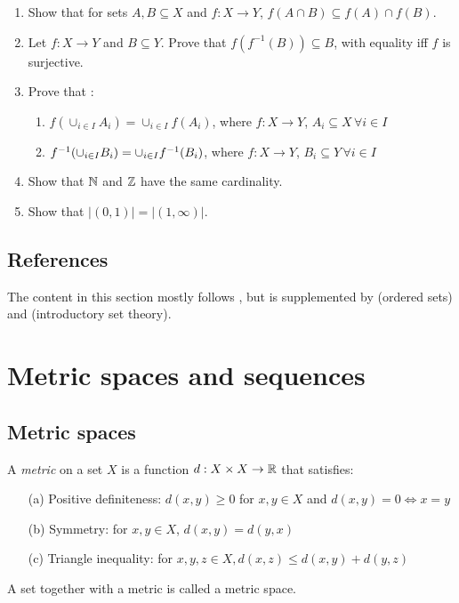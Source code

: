 \documentclass{article}
\begin{document}
\begin{enumerate}
    \item Show that for sets $A,B \subseteq X$ and $f: X \to Y$, $f(A \cap B) \subseteq f(A) \cap f(B)$.
    \item Let $f: X \to Y$ and $B \subseteq Y$. Prove that $f(f^{-1}(B)) \subseteq B$, with equality iff $f$ is surjective.
    \item Prove that :
    \begin{enumerate}
        \item $f(\cup_{i \in I}A_i) = \cup_{i \in I}f(A_i)$, where $f:X \to Y$, $A_i \subseteq X \, \forall i \in I$
        \item $f^{-1}(\cup_{i \in I}B_i) = \cup_{i \in I}f^{-1}(B_i)$, where $f:X \to Y$, $B_i \subseteq Y \, \forall i \in I$
    \end{enumerate}
    \item Show that ${\mathbb{N}}$ and ${\mathbb{Z}}$ have the same cardinality.
    \item Show that $|(0,1)| =|(1,\infty)|$.
\end{enumerate}


\subsection{References}
The content in this section mostly follows \cite{tastetopology}, but is supplemented by \cite{marcoux2019} (ordered sets) and \cite{piotr} (introductory set theory).

\section{Metric spaces and sequences}

\subsection{Metric spaces}
\begin{definition}
A \emph{metric} on a set $X$ is a function $d:X \times X \to {\mathbb{R}}$ that satisfies:
\begin{enumerate}
    \item[(a)] Positive definiteness: $d(x,y) \geq 0$ for $x,y \in X$ and $d(x,y) = 0 \Leftrightarrow x = y$
    \item[(b)] Symmetry: for $x,y \in X$, $d(x,y)= d(y,x)$
    \item[(c)] Triangle inequality: for $x,y,z \in X, d(x,z) \leq d(x,y) + d(y,z)$
\end{enumerate}
A set together with a metric is called a metric space.
\end{definition}
\end{document}
